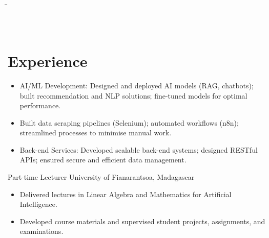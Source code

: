 \documentclass[a4paper,oneside]{article}
\begin{document}
	\fontsize{9}{12}\selectfont
\begin{minipage}{\linewidth}
		\begin{tabbing}
			\hspace{7cm}\=\kill
			 \>
			\href{https://www.linkedin.com/in/jean-lucien-randrianantenaina-82b98622b}{} \\[2pt]
			\href{mailto:rjlucienaina@gmail.com}{} \>
			\href{https://fahazavana.github.io}{} \\[2pt]
			\href{tel:+261345898164}{} \>
			\href{https://github.com/Fahazavana}{} \\[2pt]
		\end{tabbing}
	\end{minipage}

	\section{Experience}
	{\vspace*{-3.5ex}\begin{itemize}[itemsep=-1ex, leftmargin=0.3cm]
			\item AI/ML Development: Designed and deployed AI models (RAG, chatbots); built recommendation and NLP solutions; fine-tuned models for optimal performance.
			\item Built data scraping pipelines (Selenium); automated workflows (n8n); streamlined processes to minimise manual work.
			\item Back-end Services: Developed scalable back-end systems; designed RESTful APIs; ensured secure and efficient data management.
	\end{itemize}}
	\vspace*{-2ex}
	{Part-time Lecturer}
	{University of Fianarantsoa, Madagascar}
	{\vspace*{-3.5ex}\begin{itemize}[itemsep=-1ex, leftmargin=0.3cm]
			\item Delivered lectures in Linear Algebra and Mathematics for Artificial Intelligence.
			\item Developed course materials and supervised student projects, assignments, and examinations.
		\end{itemize}
	}
	\vspace*{-3ex}
\end{document}

